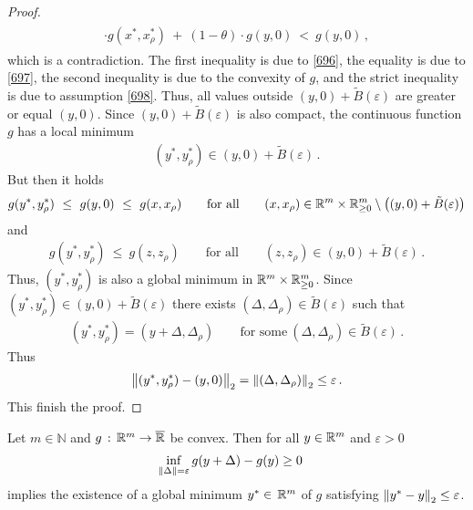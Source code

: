 \begin{proof}
\begin{align*}
\begin{split}
    \cdot
      g
  (
x^*,x^*_\rho
  )
  \ 
  +
  \ 
  (
  1
  -
\theta
  )
  \cdot
  g
  (y,0)
  \ 
      <
  \ 
      g(y,0)
  \,    ,
      \end{split}
    \end{align*}
    which is a contradiction.
    The first inequality is due to \eqref{696}, the equality is due to \eqref{697}, the second inequality is due to the convexity of $g$,
    and the strict inequality is due to assumption \eqref{698}.
    Thus, all values outside 
    $(y,0)+\tilde{B}(\varepsilon)$
    are greater or equal $(y,0)$.
    Since 
    $(y,0)+\tilde{B}(\varepsilon)$
    is also compact, the continuous function $g$ has a local minimum
    \begin{gather*}
      (y^*,y^*_\rho)\in
    (y,0)+\tilde{B}(\varepsilon)
    \,.
    \end{gather*}
    But then it holds
    \begin{gather*}
      g
      (y^*,y^*_\rho)
      \ 
      \le
      \ 
      g(y,0)
      \ 
      \le
      \ 
      g
      (x,x_\rho)
      \qquad
      \text{for all}
      \qquad 
      (x,x_\rho)
      \in
\R^m\times\R^m_{\ge 0}\setminus 
\left(
  (y,0)
  +
    \tilde{B}(\varepsilon)
\right)
    \end{gather*}
    and
    \begin{gather*}
      g
      (y^*,y^*_\rho)
      \ 
      \le
      \ 
      g
      (z,z_\rho)
      \qquad
      \text{for all}
      \qquad 
      (z,z_\rho)
      \in
  (y,0)
  +
    \tilde{B}(\varepsilon)
    \,.
    \end{gather*}
    Thus,
    $
      (y^*,y^*_\rho)
    $
    is also a global minimum in
    $
\mathbb{R}^m\times\mathbb{R}^m_{\ge 0}
    $.
Since
    $
      (y^*,y^*_\rho)
      \in
  (y,0)
  +
    \tilde{B}(\varepsilon)
    $
    there exists
    $
    (\Delta,\Delta_\rho)\in
    \tilde{B}(\varepsilon)
    $
    such that 
    \begin{gather*}
      (y^*,y^*_\rho)
      =
      (y+\Delta,\Delta_\rho)
      \qquad
      \text{for some}\ 
      (\Delta,\Delta_\rho)
      \in
      \tilde{B}(\varepsilon)
      \,.
    \end{gather*}
  Thus
  \begin{gather*}
    \left\lVert
      (y^*,y^*_\rho)
      -
      (y,0)
    \right\rVert_2
    =
    \left\lVert
      (\Delta,\Delta_\rho)
    \right\rVert_2
    \le \varepsilon
    \,.
  \end{gather*}
  This finish the proof.
\end{proof}
\begin{lemma}
  \label{bw:cd:lem}
  Let $m\in\mathbb{N}$ and
  $g \,:\, \mathbb{R}^m \to \overline{\mathbb{R}}$ 
  be convex.
  Then 
  for all $y \in \mathbb{R}^m$ and $\varepsilon>0$ 
    \begin{gather}
      \label{7060_0}
      \inf_{\left\lVert\Delta\right\rVert=\varepsilon} g(y+\Delta) - g(y) \ge 0 \quad
    \end{gather}
    implies
    the existence of  
    a global minimum
    $
    y^* \in \,\mathbb{R}^m
    $
    of $g$
    satisfying
    $
      \left\lVert y^* - y\right\rVert_2 \le \varepsilon
    $.
\end{lemma}
